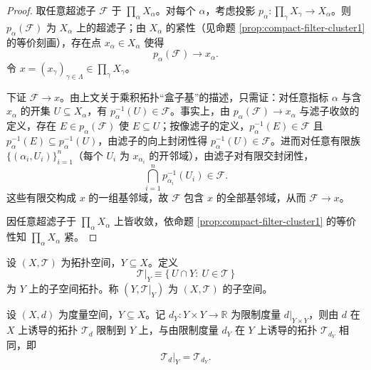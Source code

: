 \documentclass[lang=cn,a4paper,newtx,figureplace=section,tableplace=section]{elegantbook}
\begin{document}
 \begin{proof}
  取任意超滤子 $\mathcal F$ 于 $\prod_{\alpha}X_\alpha$。对每个 $\alpha$，考虑投影 $p_\alpha: \prod_{\gamma}X_\gamma\to X_\alpha$。则 $p_\alpha(\mathcal F)$ 为 $X_\alpha$ 上的超滤子；由 $X_\alpha$ 的紧性（见命题 \ref{prop:compact-filter-cluster1} 的等价刻画），存在点 $x_\alpha\in X_\alpha$ 使得
  \[
   p_\alpha(\mathcal F)\to x_\alpha.
  \]
  令 $x=(x_\gamma)_{\gamma\in\Lambda}\in\prod_{\gamma}X_\gamma$。
 
  下证 $\mathcal F\to x$。由上文关于乘积拓扑“盒子基”的描述，只需证：对任意指标 $\alpha$ 与含 $x_\alpha$ 的开集 $U\subseteq X_\alpha$，有 $p_\alpha^{-1}(U)\in\mathcal F$。事实上，由 $p_\alpha(\mathcal F)\to x_\alpha$ 与滤子收敛的定义，存在 $E\in p_\alpha(\mathcal F)$ 使 $E\subseteq U$；按像滤子的定义，$p_\alpha^{-1}(E)\in\mathcal F$ 且 $p_\alpha^{-1}(E)\subseteq p_\alpha^{-1}(U)$，由滤子的向上封闭性得 $p_\alpha^{-1}(U)\in\mathcal F$。进而对任意有限族 $\{(\alpha_i,U_i)\}_{i=1}^n$（每个 $U_i$ 为 $x_{\alpha_i}$ 的开邻域），由滤子对有限交封闭性，
  \[
   \bigcap_{i=1}^n p_{\alpha_i}^{-1}(U_i)\in\mathcal F.
  \]
  这些有限交构成 $x$ 的一组基邻域，故 $\mathcal F$ 包含 $x$ 的全部基邻域，从而 $\mathcal F\to x$。
 
  因任意超滤子于 $\prod_{\alpha}X_\alpha$ 上皆收敛，依命题 \ref{prop:compact-filter-cluster1} 的等价性知 $\prod_{\alpha}X_\alpha$ 紧。
 \end{proof}
 
 \begin{definition}[子空间拓扑]\label{def:subspace-topology}
  设 $(X,\mathcal T)$ 为拓扑空间，$Y\subseteq X$。定义
  \[
   \mathcal T|_Y\equiv\{\,U\cap Y:\ U\in\mathcal T\,\}
  \]
  为 $Y$ 上的子空间拓扑。称 $(Y,\mathcal T|_Y)$ 为 $(X,\mathcal T)$ 的子空间。
 \end{definition}
 
 \begin{proposition}[度量子空间]\label{prop:metric-subspace}
  设 $(X,d)$ 为度量空间，$Y\subseteq X$。记 $d_Y:Y\times Y\to\mathbb R$ 为限制度量 $d|_{Y\times Y}$，则由 $d$ 在 $X$ 上诱导的拓扑 $\mathcal T_d$ 限制到 $Y$ 上，与由限制度量 $d_Y$ 在 $Y$ 上诱导的拓扑 $\mathcal T_{d_Y}$ 相同，即
  \[
   \mathcal T_d|_Y=\mathcal T_{d_Y}.
  \]
 \end{proposition}
\end{document}
